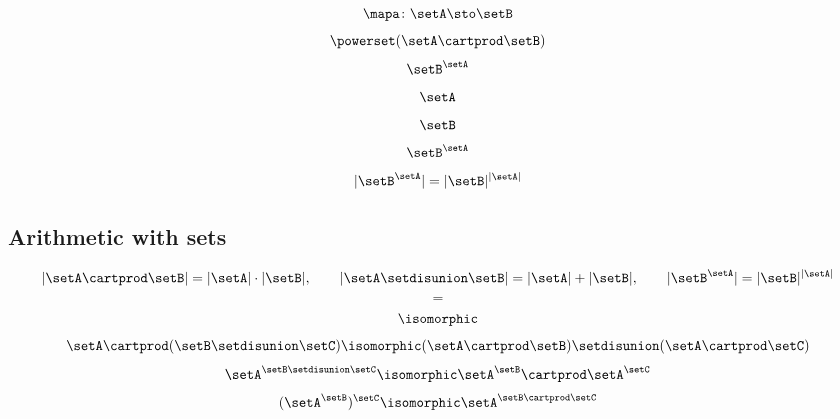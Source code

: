 \begin{forslides}
    \begin{equation}
        \label{eq:slides_session2_156}
        \mapa \colon \setA \sto \setB
    \end{equation}
    \begin{equation}
        \label{eq:slides_session2_157}
        \powerset (\setA \cartprod \setB)
    \end{equation}
    \begin{equation}
        \label{eq:slides_session2_158}
        \setB^{\setA}
    \end{equation}
    \begin{equation}
        \label{eq:slides_session2_159}
        \setA
    \end{equation}
    \begin{equation}
        \label{eq:slides_session2_160}
        \setB
    \end{equation}
    \begin{equation}
        \label{eq:slides_session2_161}
        \setB^{\setA}
    \end{equation}
    \begin{equation}
        \label{eq:slides_session2_162}
        \vert \setB^{\setA} \vert = \vert \setB \vert^{\vert \setA \vert}
    \end{equation}

    \subsection{Arithmetic with sets}

    \begin{equation}
        \label{eq:slides_session2_163}
        \vert \setA \cartprod \setB \vert = \vert \setA \vert \cdot \vert \setB \vert, \qquad \vert \setA \setdisunion \setB \vert = \vert \setA \vert + \vert \setB \vert, \qquad \vert \setB^{\setA} \vert = \vert \setB \vert^{\vert \setA \vert}
    \end{equation}
    \begin{equation}
        \label{eq:slides_session2_164}
        =
    \end{equation}
    \begin{equation}
        \label{eq:slides_session2_165}
        \isomorphic
    \end{equation}
    \begin{equation}
        \label{eq:slides_session2_166}
        \setA \cartprod (\setB \setdisunion \setC)  \isomorphic (\setA \cartprod \setB) \setdisunion (\setA \cartprod \setC)
    \end{equation}
    \begin{equation}
        \label{eq:slides_session2_167}
        \setA^{\setB \setdisunion \setC} \isomorphic \setA^\setB \cartprod \setA^\setC
    \end{equation}
    \begin{equation}
        \label{eq:slides_session2_168}
        (\setA^\setB)^\setC  \isomorphic \setA^{\setB \cartprod \setC}
    \end{equation}


\end{forslides}
